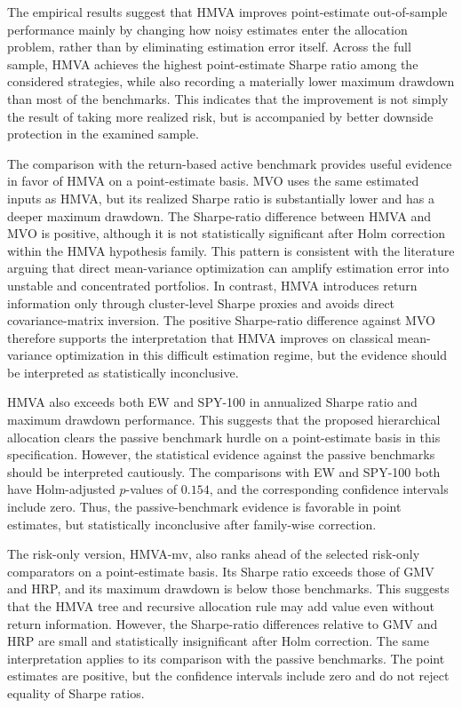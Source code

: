 \documentclass[12pt]{article}
\begin{document}
The empirical results suggest that HMVA improves point-estimate out-of-sample performance mainly by changing how noisy estimates enter the allocation problem, rather than by eliminating estimation error itself. Across the full sample, HMVA achieves the highest point-estimate Sharpe ratio among the considered strategies, while also recording a materially lower maximum drawdown than most of the benchmarks. This indicates that the improvement is not simply the result of taking more realized risk, but is accompanied by better downside protection in the examined sample.

The comparison with the return-based active benchmark provides useful evidence in favor of HMVA on a point-estimate basis. MVO uses the same estimated inputs as HMVA, but its realized Sharpe ratio is substantially lower and has a deeper maximum drawdown. The Sharpe-ratio difference between HMVA and MVO is positive, although it is not statistically significant after Holm correction within the HMVA hypothesis family. This pattern is consistent with the literature arguing that direct mean-variance optimization can amplify estimation error into unstable and concentrated portfolios. In contrast, HMVA introduces return information only through cluster-level Sharpe proxies and avoids direct covariance-matrix inversion. The positive Sharpe-ratio difference against MVO therefore supports the interpretation that HMVA improves on classical mean-variance optimization in this difficult estimation regime, but the evidence should be interpreted as statistically inconclusive.

HMVA also exceeds both EW and SPY-100 in annualized Sharpe ratio and maximum drawdown performance. This suggests that the proposed hierarchical allocation clears the passive benchmark hurdle on a point-estimate basis in this specification. However, the statistical evidence against the passive benchmarks should be interpreted cautiously. The comparisons with EW and SPY-100 both have Holm-adjusted $p$-values of $0.154$, and the corresponding confidence intervals include zero. Thus, the passive-benchmark evidence is favorable in point estimates, but statistically inconclusive after family-wise correction.

The risk-only version, HMVA-mv, also ranks ahead of the selected risk-only comparators on a point-estimate basis. Its Sharpe ratio exceeds those of GMV and HRP, and its maximum drawdown is below those benchmarks. This suggests that the HMVA tree and recursive allocation rule may add value even without return information. However, the Sharpe-ratio differences relative to GMV and HRP are small and statistically insignificant after Holm correction. The same interpretation applies to its comparison with the passive benchmarks. The point estimates are positive, but the confidence intervals include zero and do not reject equality of Sharpe ratios.
\end{document}
